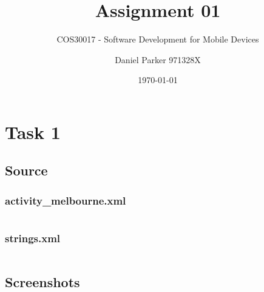 \documentclass[11pt,english,numbers=endperiod,parskip=half]{scrartcl}
\title{Assignment 01}
\subtitle{COS30017 - Software Development for Mobile Devices}
\author{Daniel Parker 971328X}
\date{\today}
\begin{document}
\maketitle
\thispagestyle{empty}

\section{Task 1}
\subsection{Source}
\subsubsection{activity\_melbourne.xml}
\inputminted{xml}{../../Apps/Melbourne/app/src/main/res/layout/activity_melbourne.xml}

\subsubsection{strings.xml}
\inputminted{xml}{../../Apps/Melbourne/app/src/main/res/values/strings.xml}

\subsection{Screenshots}
\setlength\fboxsep{0pt}
\setlength\fboxrule{0.5pt}
\\
\bigskip
{}
\\
\end{document}
